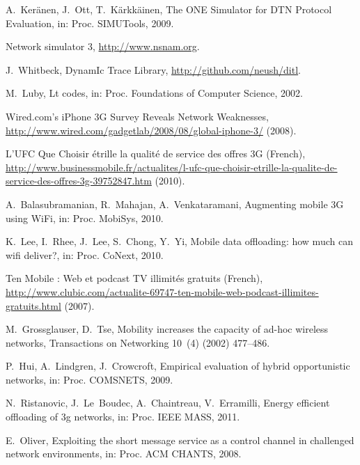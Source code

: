 \documentclass[preprint]{elsarticle}
\begin{document}
\begin{thebibliography}{10}
A.~Ker\"{a}nen, J.~Ott, T.~K\"{a}rkk\"{a}inen, {The ONE Simulator for DTN
  Protocol Evaluation}, in: Proc. {SIMUTools}, 2009.

Network simulator 3, \href{http://www.nsnam.org}{http://www.nsnam.org}.

J.~Whitbeck, {DynamIc Trace Library},
  \href{http://github.com/neush/ditl}{http://github.com/neush/ditl}.

M.~Luby, Lt codes, in: Proc. Foundations of Computer Science, 2002.

{Wired.com's iPhone 3G Survey Reveals Network Weaknesses},
  \href{http://www.wired.com/gadgetlab/2008/08/global-iphone-3/}{http://www.wired.com/gadgetlab/2008/08/global-iphone-3/} (2008).

{L'UFC Que Choisir \'etrille la qualit\'e de service des offres 3G (French)},
  \href{http://www.businessmobile.fr/actualites/l-ufc-que-choisir-etrille-la-qualite-de-service-des-offres-3g-39752847.htm}{http://www.businessmobile.fr/actualites/l-ufc-que-choisir-etrille-la-qualite-de-service-des-offres-3g-39752847.htm} (2010).

A.~Balasubramanian, R.~Mahajan, A.~Venkataramani, Augmenting mobile {3G} using
  {WiFi}, in: Proc. {MobiSys}, 2010.

K.~Lee, I.~Rhee, J.~Lee, S.~Chong, Y.~Yi, Mobile data offloading: how much can
  wifi deliver?, in: Proc. {CoNext}, 2010.

{Ten Mobile : Web et podcast TV illimit\'es gratuits (French)},
  \href{http://www.clubic.com/actualite-69747-ten-mobile-web-podcast-illimites-gratuits.html}{http://www.clubic.com/actualite-69747-ten-mobile-web-podcast-illimites-gratuits.html} (2007).

M.~Grossglauser, D.~Tse, Mobility increases the capacity of ad-hoc wireless
  networks, Transactions on Networking 10~(4) (2002) 477--486.

P.~Hui, A.~Lindgren, J.~Crowcroft, {Empirical evaluation of hybrid
  opportunistic networks}, in: Proc. {COMSNETS}, 2009.

N.~Ristanovic, J.~Le~Boudec, A.~Chaintreau, V.~Erramilli, Energy efficient
  offloading of 3g networks, in: Proc. {IEEE MASS}, 2011.

E.~Oliver, {Exploiting the short message service as a control channel in
  challenged network environments}, in: Proc. {ACM CHANTS}, 2008.


\end{thebibliography}
\end{document}
